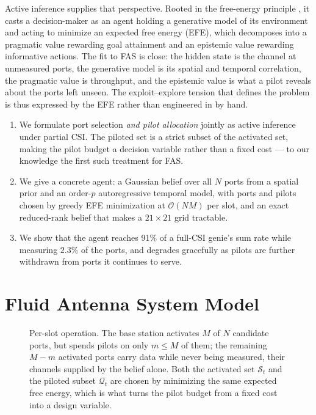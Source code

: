\documentclass[journal]{IEEEtran}
\begin{document}
Active inference supplies that perspective. Rooted in the free-energy principle
\cite{parr2022active}, it casts a decision-maker as an agent holding a
generative model of its environment and acting to minimize an expected free
energy (EFE), which decomposes into a pragmatic value rewarding goal attainment
and an epistemic value rewarding informative actions. The fit to FAS is close:
the hidden state is the channel at unmeasured ports, the generative model is
its spatial and temporal correlation, the pragmatic value is throughput, and
the epistemic value is what a pilot reveals about the ports left unseen. The
exploit--explore tension that defines the problem is thus expressed by the EFE
rather than engineered in by hand.

\begin{enumerate}
\item We formulate port selection \emph{and pilot allocation} jointly as active
inference under partial CSI. The piloted set is a strict subset of the
activated set, making the pilot budget a decision variable rather than a fixed
cost --- to our knowledge the first such treatment for FAS.

\item We give a concrete agent: a Gaussian belief over all $N$ ports from a
spatial prior and an order-$p$ autoregressive temporal model, with ports and
pilots chosen by greedy EFE minimization at $\mathcal{O}(NM)$ per slot, and an
exact reduced-rank belief that makes a $21\times21$ grid tractable.

\item We show that the agent reaches 91\% of a full-CSI genie's sum rate while
measuring $2.3\%$ of the ports, and degrades gracefully as pilots are further
withdrawn from ports it continues to serve.
\end{enumerate}

\section{Fluid Antenna System Model}
\label{sec:model}

\begin{figure}[t]
  \centering
  
  \caption{Per-slot operation. The base station activates $M$ of $N$ candidate
  ports, but spends pilots on only $m\le M$ of them; the remaining $M-m$
  activated ports carry data while never being measured, their channels
  supplied by the belief alone. Both the activated set $\mathcal{S}_t$ and the
  piloted subset $\mathcal{Q}_t$ are chosen by minimizing the same expected
  free energy, which is what turns the pilot budget from a fixed cost into a
  design variable.}
  \label{fig:timeline}
\end{figure}
\end{document}
